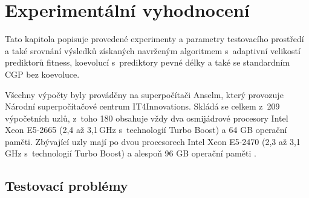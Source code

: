 %

\chapter{Experimentální vyhodnocení}
\label{chExperiments}

Tato kapitola popisuje provedené experimenty a parametry testovacího prostředí a také srovnání výsledků získaných navrženým algoritmem s~adaptivní velikostí prediktorů fitness, koevolucí s~prediktory pevné délky a také se standardním CGP bez koevoluce.

Všechny výpočty byly prováděny na superpočítači Anselm, který provozuje Národní superpočítačové centrum IT4Innovations. Skládá se celkem z~209 výpočetních uzlů, z~toho 180 obsahuje vždy dva osmijádrové procesory Intel Xeon E5-2665 (2,4 až 3,1\,GHz s~technologií Turbo Boost) a 64 GB operační paměti. Zbývající uzly mají po dvou procesorech Intel Xeon E5-2470 (2,3 až 3,1\,GHz s~technologií Turbo Boost) a alespoň 96 GB operační paměti \cite{AnselmSpecs}.


\section{Testovací problémy}
\label{secExpProblems}

